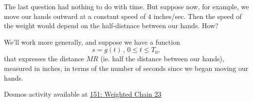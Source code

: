 \documentclass{ximera}
\begin{document}
\begin{question}  \label{Q:DFDFGGtg}
The last question had nothing to do with time. But suppose now, for example,  we move our hands outward at a constant speed of $4$ inches/sec. Then the speed of the weight would depend on the half-distnace between our hands. How?

We'll work more generally, and suppose we have a function
\[
   s = g(t) \, , \, 0\leq t \leq T_0,
\]
that expresses the distance $MR$ (ie. half the distance between our hands), measured in inches, in terms of the number of seconds since we began moving our hands.

\begin{onlineOnly}
    \begin{center}
\end{center}
\end{onlineOnly}

Desmos activity available at \href{https://www.desmos.com/calculator/x0e7h7sobg}{151: Weighted Chain 23}

\end{question}
\end{document}
